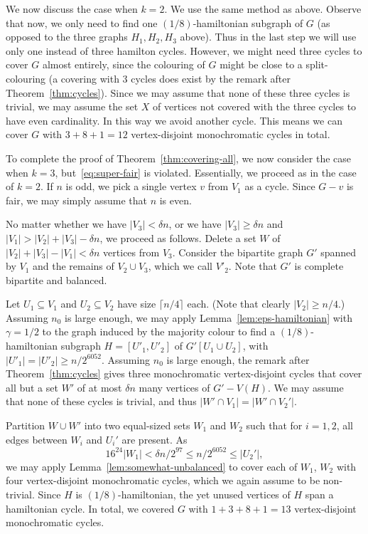 \documentclass[a4paper,10pt]{article}
\begin{document}
We now discuss the case when $k=2$.
We use the same method as above. 
Observe that now, we only need to find one $(1/8)$-hamiltonian subgraph of $G$ (as opposed to the three graphs $H_1,H_2,H_3$ above).  
Thus in the last step we will use  only one instead of three hamilton cycles. 
However, we might need three cycles to cover $G$ almost entirely, since the colouring of $G$ might be close to a split-colouring (a covering with 3 cycles does exist by the remark after Theorem~\ref{thm:cycles}).
Since we may assume that none of these three cycles is trivial, we may assume the set $X$ of vertices not covered with the three cycles to have even cardinality.
In this way we avoid another cycle. 
This means we can cover $G$ with $3+8+1=12$ vertex-disjoint monochromatic cycles in total.
\medskip

To complete the proof of Theorem~\ref{thm:covering-all}, we now consider the case when $k=3$, but~\eqref{eq:super-fair} is violated.
Essentially, we proceed as in the case of $k=2$.
If $n$ is odd, we pick a single vertex $v$ from $V_1$ as a cycle.
Since $G-v$ is fair, we may simply assume that $n$ is even.

No matter whether we have $|V_3| < \delta n$, or we have $|V_3| \ge \delta n$ and $|V_1| > |V_2| + |V_3| - \delta n$, we proceed as follows. Delete a set $W$ of $|V_2| + |V_3|- |V_1| < \delta n$ vertices from $V_3$. Consider the bipartite graph $G'$ spanned by $V_1$ and the remains of $V_2\cup V_3$, which we call $V'_2$. Note that $G'$ is complete bipartite and balanced.

Let $U_1 \subseteq V_1$ and $U_2 \subseteq V_2$ have size $\lceil n/4\rceil$ each.
(Note that clearly $|V_2|\geq n/4$.) Assuming $n_0$ is large enough, we may
apply Lemma~\ref{lem:eps-hamiltonian} with $\gamma=1/2$ to the graph induced by  the majority colour to find a $(1/8)$-hamiltonian subgraph $H=[U'_1,U'_2]$ of $G'[U_1 \cup U_2]$, with 
$|U'_1|=|U'_2| \ge n/2^{6052}$.
Assuming $n_0$ is large enough, the remark after
Theorem~\ref{thm:cycles} gives three monochromatic vertex-disjoint cycles that cover all but a set $W'$ of at most $\delta n$ many vertices of $G'- V(H)$.
We may assume that none of these cycles is trivial, and thus $|W' \cap V_1| = |W' \cap V_2'|$.

Partition $W \cup W'$ into two equal-sized sets $W_1$ and $W_2$ such that for $i=1,2$, all edges between $W_i$ and $U_i'$ are present. As
$$16^{24} |W_1|  < \delta  n /2^{97}\leq n/2^{6052} \le |U_2'|,$$
we may apply Lemma~\ref{lem:somewhat-unbalanced} to cover each of $W_1$, $ W_2$ with four vertex-disjoint monochromatic cycles, which we again assume to be non-trivial.
Since $H$ is $(1/8)$-hamiltonian, the yet unused vertices of $H$ span a hamiltonian cycle. In total, we covered $G$ with $1+3+8+1=13$ vertex-disjoint monochromatic cycles.
\end{document}

